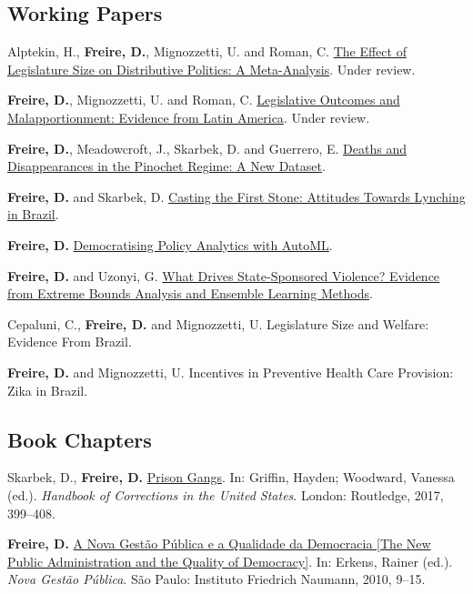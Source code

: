 \documentclass[a4paper]{article}
\renewenvironment{itemize}{
	\begin{list}{}{
			\setlength{\leftmargin}{1.5em}
		}
		}{
	\end{list}
}
\begin{document}
\subsection*{Working Papers}

\begin{itemize}
\item Alptekin, H., \textbf{Freire, D.}, Mignozzetti, U. and Roman, C. \href{https://doi.org/10.31235/osf.io/xf7wp}{The Effect of Legislature Size on Distributive Politics: A Meta-Analysis}. Under review.
\item \textbf{Freire, D.}, Mignozzetti, U. and Roman, C. \href{https://github.com/catarinaroman/malapportionment-lat-am}{Legislative Outcomes and Malapportionment: Evidence from Latin America}. Under review.
\item \textbf{Freire, D.}, Meadowcroft, J., Skarbek, D. and Guerrero, E. \href{https://osf.io/vqnwu}{Deaths and Disappearances in the Pinochet Regime: A New Dataset}.
\item \textbf{Freire, D.} and Skarbek, D. \href{https://github.com/danilofreire/lynching-experiment-brazil}{Casting the First Stone: Attitudes Towards Lynching in Brazil}.
\item \textbf{Freire, D.} \href{https://github.com/danilofreire/mercatus-analytics-papers/automl-paper}{Democratising Policy Analytics with AutoML}. 
\item \textbf{Freire, D.} and Uzonyi, G. \href{https://osf.io/pzx3q}{What Drives State-Sponsored Violence? Evidence from Extreme Bounds Analysis and Ensemble Learning Methods}.
\item Cepaluni, C., \textbf{Freire, D.} and Mignozzetti, U. Legislature Size and Welfare: Evidence From Brazil. 
\item \textbf{Freire, D.} and Mignozzetti, U. Incentives in Preventive Health Care Provision: Zika in Brazil.
\end{itemize}

\subsection*{Book Chapters}

\begin{itemize}
\item Skarbek, D., \textbf{Freire, D.} \href{https://osf.io/kuqqx/}{Prison Gangs}. In: Griffin, Hayden; Woodward, Vanessa (ed.). \textit{Handbook of Corrections in the United States}. London: Routledge, 2017, 399--408.
\item \textbf{Freire, D.} \href{https://fnst.org/sites/default/files/uploads/2017/12/08/ngp.pdf}{A Nova Gest\~{a}o P\'{u}blica e a Qualidade da Democracia {[}The New Public Administration and the Quality of Democracy{]}}. In: Erkens, Rainer (ed.). \textit{Nova Gest\~{a}o P\'{u}blica}. S\~{a}o Paulo: Instituto Friedrich Naumann, 2010, 9--15.
\end{itemize}
\end{document}
